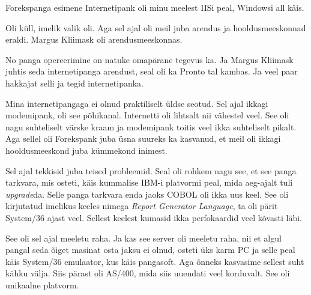 Forekspanga esimene Internetipank oli minu meelest IISi peal, Windowsi all käis. 


Oli küll, imelik valik oli. Aga sel ajal oli meil juba arendus ja hooldusmeeskonnad eraldi. Margus Kliimask oli arendusmeeskonnas. 


No panga opereerimine on natuke omapärane tegevus ka. Ja Margus Kliimask juhtis seda internetipanga arendust, seal oli ka Pronto tal kambas. Ja  veel paar hakkajat selli ja tegid internetipanka. 


Mina internetipangaga ei olnud praktiliselt üldse seotud. Sel ajal ikkagi modemipank, oli see põhikanal. Internetti oli lihtsalt nii vähestel veel. See oli nagu suhteliselt värske kraam ja modemipank toitis veel ikka suhteliselt pikalt. Aga sellel oli Forekspank juba üsna suureks ka kasvanud, et meil oli ikkagi hooldusmeeskond juba kümmekond inimest.


Sel ajal tekkisid juba teised probleemid. Seal oli rohkem nagu see, et see panga tarkvara, mis osteti, käis kummalise IBM-i platvormi peal, mida aeg-ajalt tuli \emph{upgrade}da. Selle panga tarkvara enda jaoks COBOL oli ikka uus keel. See oli kirjutatud imelikus keeles nimega \emph{Report Generator Language}, ta oli pärit System/36 ajast veel. Sellest keelest kumasid ikka perfokaardid veel kõvasti läbi.


See oli sel ajal meeletu raha.  Ja kas see server oli meeletu raha, nii et algul pangal seda õiget masinat osta jaksu ei olnud, osteti üks karm PC ja selle peal käis System/36 emulaator, kus käis pangasoft. Aga õnneks kasvasime sellest suht kähku välja. Siis pärast oli AS/400, mida siis uuendati veel korduvalt. See oli unikaalne platvorm.

